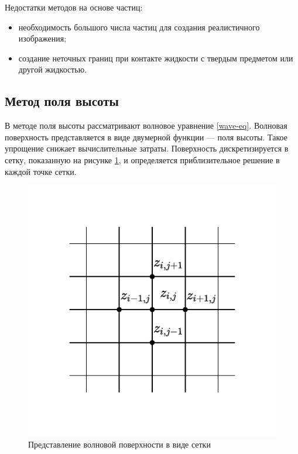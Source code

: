 Недостатки методов на основе частиц:
\begin{itemize}
	\item необходимость большого числа частиц для создания реалистичного изображения;
	\item создание неточных границ при контакте жидкости с твердым предметом или другой жидкостью.
\end{itemize} 

\subsection{Метод поля высоты}

В методе поля высоты \cite{heightfield} рассматривают волновое уравнение \ref{wave-eq}. Волновая поверхность представляется в виде двумерной функции --- поля высоты. Такое упрощение снижает вычислительные затраты. Поверхность дискретизируется в сетку, показанную на рисунке \ref{img:grid}, и определяется приблизительное решение в каждой точке сетки.

\begin{figure}[H]
	\begin{center}
		\includegraphics[scale=0.9]{img/grid.pdf}
	\end{center}
	\captionsetup{justification=centering}
	\caption{Представление волновой поверхности в виде сетки}
	\label{img:grid}
\end{figure}

